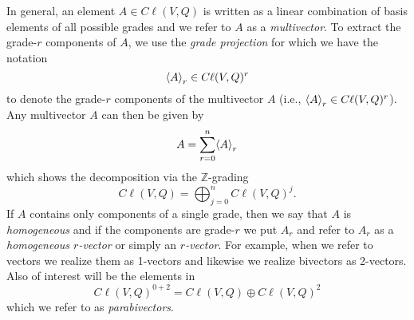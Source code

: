 In general, an element $A \in C\ell(V,Q)$ is written as a linear combination of basis elements of all possible grades and we refer to $A$ as a \emph{multivector}.  To extract the grade-$r$ components of $A$, we use the \emph{grade projection} for which we have the notation
\begin{equation}
\proj{r}{A} \in C\ell(V,Q)^r
\end{equation}
to denote the grade-$r$ components of the multivector $A$ (i.e., $\proj{r}{A} \in C\ell(V,Q)^r$). Any multivector $A$ can then be given by
\begin{equation}
A = \sum_{r=0}^n \proj{r}{A}
\end{equation}
which shows the decomposition via the $\mathbb{Z}$-grading
\begin{equation}
C\ell(V,Q) = \bigoplus_{j=0}^n C\ell(V,Q)^j.
\end{equation}
If $A$ contains only components of a single grade, then we say that $A$ is \emph{homogeneous} and if the components are grade-$r$ we put $A_r$ and refer to $A_r$ as a \emph{homogeneous $r$-vector} or simply an \emph{$r$-vector}.  For example, when we refer to vectors we realize them as 1-vectors and likewise we realize bivectors as 2-vectors. Also of interest will be the elements in
\begin{equation}
 C\ell(V,Q)^{0+2} = C\ell(V,Q)\oplus C\ell(V,Q)^2
\end{equation}
which we refer to as \emph{parabivectors}.

